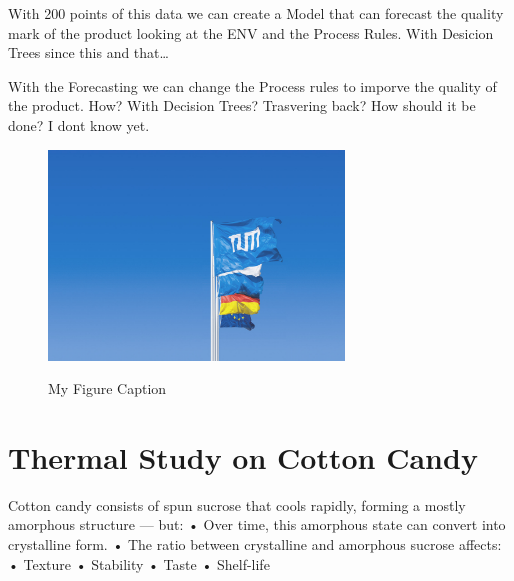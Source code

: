 With 200 points of this data we can create a Model that can forecast the quality mark of the product looking at the ENV and the Process Rules. With Desicion Trees since this and that\dots

With the Forecasting we can change the Process rules to imporve the quality of the product. How? With Decision Trees? Trasvering back? How should it be done? I dont know yet.


\begin{figure}[h]
    \centering
    \caption{My Figure Caption}
    \includegraphics[width=0.7\textwidth]{tum-resources/images/Universitaet_Flaggen.jpg}
    \label{fig:firstFigure}
\end{figure}




\section{Thermal Study on Cotton Candy}
Cotton candy consists of spun sucrose that cools rapidly, forming a mostly amorphous structure — but:
	•	Over time, this amorphous state can convert into crystalline form.
	•	The ratio between crystalline and amorphous sucrose affects:
	•	Texture
	•	Stability
	•	Taste
	•	Shelf-life


